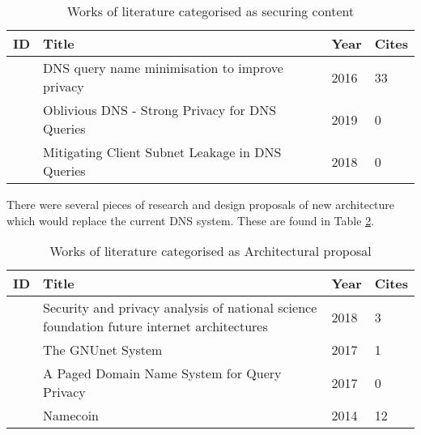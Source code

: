\begin{table}[h!]
    \begin{tabular}{ | l | p{10.5cm} | l | l |}
        \hline
            ID & Title & Year & Cites \\ \hline
            \cite{bortzmeyer2016dns} & DNS query name minimisation to improve privacy & 2016 & 33 \\ \hline
            \cite{annee-dprive-oblivious-dns-00} & Oblivious DNS - Strong Privacy for DNS Queries & 2019 & 0 \\ \hline
            \cite{pan2018mitigating} & Mitigating Client Subnet Leakage in DNS Queries & 2018 & 0 \\ \hline
        \end{tabular}
        \caption{Works of literature categorised as securing content}
\label{content}
\end{table}

There were several pieces of research and design proposals of new architecture which would replace the current DNS system. These are found in Table \ref{architectures}.

\begin{table}[h!]
    \begin{tabular}{ | l | p{10.5cm} | l | l | }
        \hline
            ID & Title & Year & Cites \\ \hline
            \cite{ambrosin2018security} & Security and privacy analysis of national science foundation future internet architectures & 2018 & 3 \\ \hline
            \cite{grothoff2017gnunet} & The GNUnet System & 2017 & 1 \\ \hline
            \cite{asoni2017paged} & A Paged Domain Name System for Query Privacy & 2017 & 0 \\ \hline
            \cite{loibl2014namecoin} & Namecoin & 2014 & 12 \\ \hline
        \end{tabular}
        \caption{Works of literature categorised as Architectural proposal}
    \label{architectures}
\end{table}
\FloatBarrier
